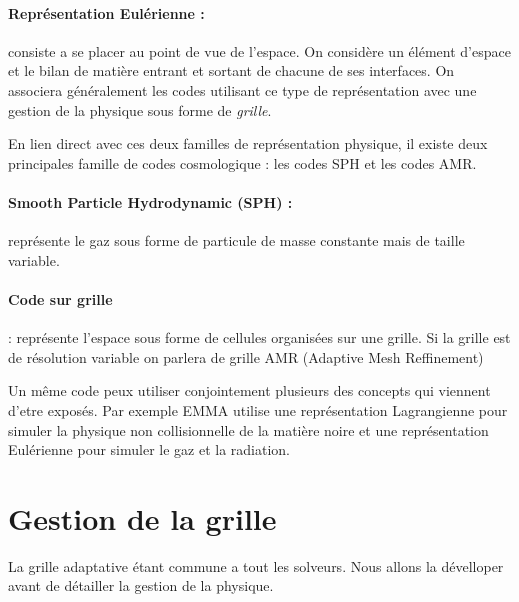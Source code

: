 \paragraph{Représentation Eulérienne : } 
consiste a se placer au point de vue de l'espace.
On considère un élément d'espace et le bilan de matière entrant et sortant de chacune de ses interfaces.
On associera généralement les codes utilisant ce type de représentation avec une gestion de la physique sous forme de \emph{grille}.

En lien direct avec ces deux familles de représentation physique, il existe deux principales famille de codes cosmologique : les codes \ac{SPH} et les codes \ac{AMR}.

\paragraph{Smooth Particle Hydrodynamic (SPH) : } représente le gaz sous forme de particule de masse constante mais de taille variable.

\paragraph{Code sur grille} : représente l'espace sous forme de cellules organisées sur une grille. 
Si la grille est de résolution variable on parlera de grille AMR (Adaptive Mesh Reffinement) 




Un même code peux utiliser conjointement plusieurs des concepts qui viennent d'etre exposés.
Par exemple EMMA utilise une représentation Lagrangienne pour simuler la physique non collisionnelle de la matière noire et une représentation Eulérienne pour simuler le gaz et la radiation.

\section{Gestion de la grille}

La grille adaptative étant commune a tout les solveurs.
Nous allons la dévelloper avant de détailler la gestion de la physique. 

